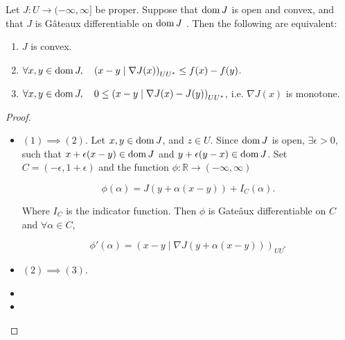 \begin{proposition}
	 Let $J: U \rightarrow (-\infty, \infty]$ be proper. Suppose that $\mathrm{dom\,} J$
	 is open and convex, and that $J$ is G\^ateaux differentiable on $\mathrm{dom\,} J$ . Then the
	 following are equivalent:
	 \begin{enumerate}
		 \item $J$ is convex.
		 \item $\forall x,y \in \mathrm{dom\,} J, \quad \left(x-y\mid \nabla J(x)\right)_{UU^*}\leq f(x)-f(y)$.
		 \item $\forall x,y \in \mathrm{dom\,} J, \quad 0 \leq \left(x-y\mid \nabla J(x)-J(y)\right)_{UU^*}$, i.e. $
		 \nabla J(x)$ is monotone.
	 \end{enumerate}
	 \begin{proof}\
	 	\begin{itemize}
		 \item $(1)\implies (2)$.  Let $x,y \in \mathrm{dom\,} J$, and $z \in U$. Since $\mathrm{dom\,} J$ is open, $\exists \epsilon >0$, such that $x+\epsilon(x-y) \in \mathrm{dom\,} J$ and $y+\epsilon(y-x) \in \mathrm{dom\,} J$. Set $C=(-\epsilon, 1+\epsilon)$ and the function $\phi: \mathbb{R}\rightarrow(-\infty, \infty)$

		 \[
			 \phi(\alpha) = J(y+\alpha(x-y))+I_C(\alpha).
		 \]
		 
		 Where $I_C$ is the indicator function.  Then $\phi$ is Gate\^aux differentiable on $C$ and $\forall \alpha \in C$,
		 
		 \[
			 \phi'(\alpha)=\left(x-y\mid\nabla J(y+\alpha (x-y))\right)_{UU^*}
		 \]
		 \item $(2)\implies(3)$. 
		 
		 \item 
		 \item 
		\end{itemize}
		 
	 \end{proof}
\label{prop5. First derivative convex.}
\end{proposition}

